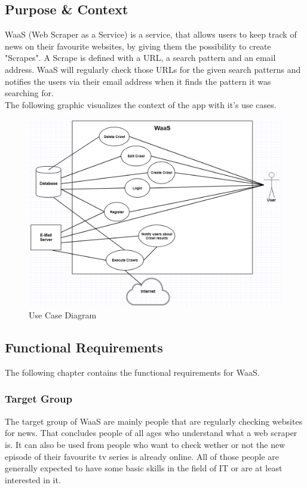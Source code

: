 \documentclass[titlepage, 12pt]{article}
\begin{document}
\subsection{Purpose \& Context}

WaaS (Web Scraper as a Service) is a service, that allows users to keep track of news on their favourite websites, by giving them the possibility to create "Scrapes". A Scrape is defined with a URL, a search pattern and an email address. WaaS will regularly check those URLs for the given search patterns and notifies the users via their email address when it finds the pattern it was searching for.
\medskip \\
The following graphic visualizes the context of the app with it's use cases.

\begin{figure}[H]
  \includegraphics[width=0.95\linewidth]{UseCaseDiagram.PNG}
  \caption{Use Case Diagram}
  \label{fig:useCaseDiagram}
\end{figure}

\subsection{Functional Requirements}

The following chapter contains the functional requirements for WaaS.

\subsubsection{Target Group}

The target group of WaaS are mainly people that are regularly checking websites for news. That concludes people of all ages who understand what a web scraper is. It can also be used from people who want to check wether or not the new episode of their favourite tv series is already online. All of those people are generally expected to have some basic skills in the field of IT or are at least interested in it.
\end{document}
